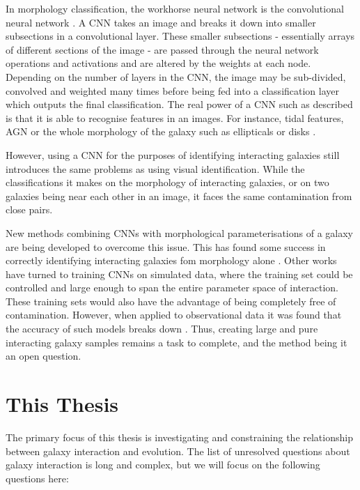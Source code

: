 In morphology classification, the workhorse neural network is the convolutional neural network \citep[CNN; examples include][]{2010MNRAS.406..342B, 2015ApJS..221....8H, 2020MNRAS.491.1554W, 2023ApJ...944..124T}. A CNN takes an image and breaks it down into smaller subsections in a convolutional layer. These smaller subsections - essentially arrays of different sections of the image - are passed through the neural network operations and activations and are altered by the weights at each node. Depending on the number of layers in the CNN, the image may be sub-divided, convolved and weighted many times before being fed into a classification layer which outputs the final classification. The real power of a CNN such as described is that it is able to recognise features in an images. For instance, tidal features, AGN or the whole morphology of the galaxy such as ellipticals or disks \citep[e.g][]{2018MNRAS.479..415A,2020ApJ...895..112G, 2022MNRAS.511.3330T, 2023ApJ...944..124T}. 

However, using a CNN for the purposes of identifying interacting galaxies still introduces the same problems as using visual identification. While the classifications it makes on the morphology of interacting galaxies, or on two galaxies being near each other in an image, it faces the same contamination from close pairs.

New methods combining CNNs with morphological parameterisations of a galaxy are being developed to overcome this issue. This has found some success in correctly identifying interacting galaxies fom morphology alone \citep{2023ApJ...958...96R}. Other works have turned to training CNNs on simulated data, where the training set could be controlled and large enough to span the entire parameter space of interaction. These training sets would also have the advantage of being completely free of contamination. However, when applied to observational data it was found that the accuracy of such models breaks down \citep{2019MNRAS.490.5390B, 2020A&C....3200390C}. Thus, creating large and pure interacting galaxy samples remains a task to complete, and the method being it an open question.

\section{This Thesis}
\noindent The primary focus of this thesis is investigating and constraining the relationship between galaxy interaction and evolution. The list of unresolved questions about galaxy interaction is long and complex, but we will focus on the following questions here:

